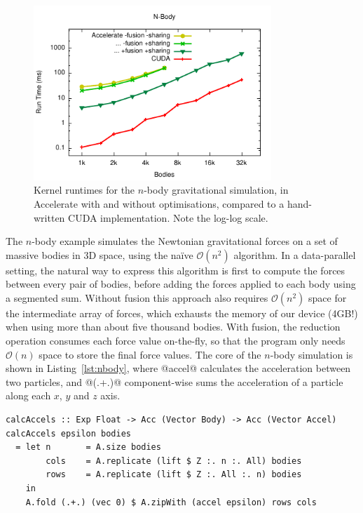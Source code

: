 \begin{figure}
    \begin{center}
        \includegraphics[width=0.8\textwidth]{images/sec-6/nbody/nbody}
    \end{center}
    \caption[N-body gravitational simulation kernel benchmarks]{Kernel runtimes
        for the $n$-body gravitational simulation, in Accelerate with and
        without optimisations, compared to a hand-written CUDA implementation.
        Note the log-log scale.}
    \label{fig:nbody}
\end{figure}

The $n$-body example simulates the Newtonian gravitational forces on a set of
massive bodies in 3D space, using the na\"ive $\mathcal{O}\left( n^{2} \right)$
algorithm. In a data-parallel setting, the natural way to express this algorithm
is first to compute the forces between every pair of bodies, before adding the
forces applied to each body using a segmented sum. Without fusion this approach
also requires $\mathcal{O}\left( n^{2} \right)$ space for the intermediate array
of forces, which exhausts the memory of our device (4GB!) when using more than
about five thousand bodies. With fusion, the reduction operation consumes each
force value on-the-fly, so that the program only needs $\mathcal{O}\left( n
\right)$ space to store the final force values. The core of the $n$-body
simulation is shown in Listing~\ref{lst:nbody}, where @accel@ calculates
the acceleration between two particles, and @(.+.)@ component-wise sums the
acceleration of a particle along each $x$, $y$ and $z$ axis.

\begin{lstlisting}[style=haskell
    ,float
    ,label=lst:nbody
    ,caption={$N$-body gravitational simulation in Accelerate}]
calcAccels :: Exp Float -> Acc (Vector Body) -> Acc (Vector Accel)
calcAccels epsilon bodies
  = let n       = A.size bodies
        cols    = A.replicate (lift $ Z :. n :. All) bodies
        rows    = A.replicate (lift $ Z :. All :. n) bodies
    in
    A.fold (.+.) (vec 0) $ A.zipWith (accel epsilon) rows cols
\end{lstlisting}

